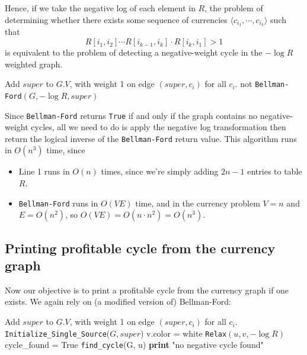 \documentclass[paper=a4, fontsize=11pt]{scrartcl} %
\numberwithin{equation}{section} %
\numberwithin{figure}{section} %
\numberwithin{table}{section} %
\begin{document}
Hence, if we take the negative log of each element in $R$, the problem of determining whether there exists some sequence of currencies $\langle c_{i_1}, \cdots, c_{i_k}\rangle$ such that
\[R[i_1, i_2] \cdots R[i_{k-1}, i_k] \cdot R[i_k, i_1] >1\]
is equivalent to the problem of detecting a negative-weight cycle in the $- \log R$ weighted graph.

\begin{algorithmic}[1]
	\State Add $super$ to $G.V$, with weight 1 on edge $(super, c_i)$ for all $c_i$.
	\State \Return not \texttt{Bellman-Ford}$(G, - \log R, super)$
	\EndFunction
\end{algorithmic}

Since \texttt{Bellman-Ford} returns \texttt{True} if and only if the graph contains no negative-weight cycles, all we need to do is apply the negative log transformation then return the logical inverse of the \texttt{Bellman-Ford} return value. This algorithm runs in $O(n^3)$ time, since
\begin{itemize}
\item Line 1 runs in $O(n)$ times, since we're simply adding $2n - 1$ entries to table $R$.
\item \texttt{Bellman-Ford} runs in $O(VE)$ time, and in the currency problem $V = n$ and $E = O(n^2)$, so $O(VE) = O(n\cdot n^2) = O(n^3)$.
\end{itemize}

\subsection{Printing profitable cycle from the currency graph}

Now our objective is to print a profitable cycle from the currency graph if one exists. We again rely on (a modified version of) Bellman-Ford:

\begin{algorithmic}
	\State Add $super$ to $G.V$, with weight 1 on edge $(super, c_i)$ for all $c_i$.
	\State \texttt{Initialize\_Single\_Source}($G,super$)
	 
		\State v.color = white
	\EndFor
			\State \texttt{Relax}$(u, v, - \log R)$ 
		\EndFor
	\EndFor
		 
			\State cycle\_found = True
			\State \texttt{find\_cycle}(G, u)
		\EndIf
	\EndFor
		\State \textbf{print} "no negative cycle found"
	\EndIf
	\EndFunction
\end{algorithmic}
\end{document}
